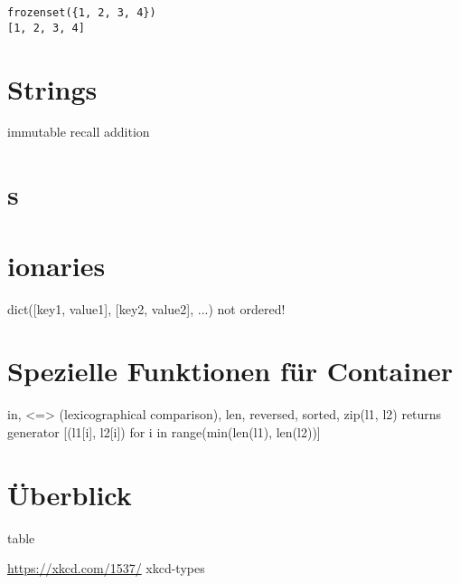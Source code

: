 \begin{cmdbox}[Ausgabe]
\begin{verbatim}
frozenset({1, 2, 3, 4})
[1, 2, 3, 4]
\end{verbatim}
\end{cmdbox}


\section{Strings}
immutable
recall addition


\section{s}


\section{ionaries}
dict([key1, value1], [key2, value2], ...)
not ordered!

\section{Spezielle Funktionen für Container}
in, <=> (lexicographical comparison), len, reversed, sorted, 
zip(l1, l2) returns generator [(l1[i], l2[i]) for i in range(min(len(l1), len(l2))]


\section{Überblick}
table

\url{https://xkcd.com/1537/}
xkcd-types